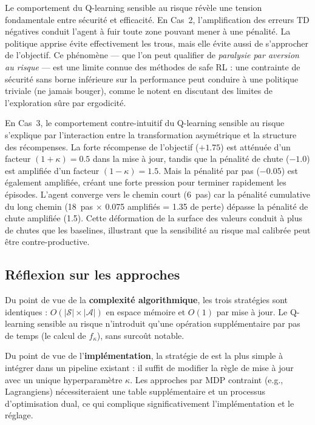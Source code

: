\documentclass{article}
\begin{document}
Le comportement du Q-learning sensible au risque \citep{mihatsch2002risksensitive} révèle une tension fondamentale entre sécurité et efficacité. En Cas~2, l'amplification des erreurs TD négatives conduit l'agent à fuir toute zone pouvant mener à une pénalité. La politique apprise évite effectivement les trous, mais elle évite aussi de s'approcher de l'objectif. Ce phénomène — que l'on peut qualifier de \textit{paralysie par aversion au risque} — est une limite connue des méthodes de safe RL : une contrainte de sécurité sans borne inférieure sur la performance peut conduire à une politique triviale (ne jamais bouger), comme le notent \citet{moldovan2012safe} en discutant des limites de l'exploration sûre par ergodicité.

En Cas~3, le comportement contre-intuitif du Q-learning sensible au risque s'explique par l'interaction entre la transformation asymétrique et la structure des récompenses. La forte récompense de l'objectif ($+1.75$) est atténuée d'un facteur $(1+\kappa) = 0.5$ dans la mise à jour, tandis que la pénalité de chute ($-1.0$) est amplifiée d'un facteur $(1-\kappa) = 1.5$. Mais la pénalité par pas ($-0.05$) est également amplifiée, créant une forte pression pour terminer rapidement les épisodes. L'agent converge vers le chemin court (6~pas) car la pénalité cumulative du long chemin (18~pas $\times$ 0.075 amplifiés = 1.35 de perte) dépasse la pénalité de chute amplifiée (1.5). Cette déformation de la surface des valeurs conduit à plus de chutes que les baselines, illustrant que la sensibilité au risque mal calibrée peut être contre-productive.

\subsection{Réflexion sur les approches}

Du point de vue de la \textbf{complexité algorithmique}, les trois stratégies sont identiques : $O(|\mathcal{S}| \times |\mathcal{A}|)$ en espace mémoire et $O(1)$ par mise à jour. Le Q-learning sensible au risque n'introduit qu'une opération supplémentaire par pas de temps (le calcul de $f_\kappa$), sans surcoût notable.

Du point de vue de l'\textbf{implémentation}, la stratégie de \citet{mihatsch2002risksensitive} est la plus simple à intégrer dans un pipeline existant : il suffit de modifier la règle de mise à jour avec un unique hyperparamètre $\kappa$. Les approches par MDP contraint (e.g., Lagrangiens) nécessiteraient une table supplémentaire et un processus d'optimisation dual, ce qui complique significativement l'implémentation et le réglage.
\end{document}
